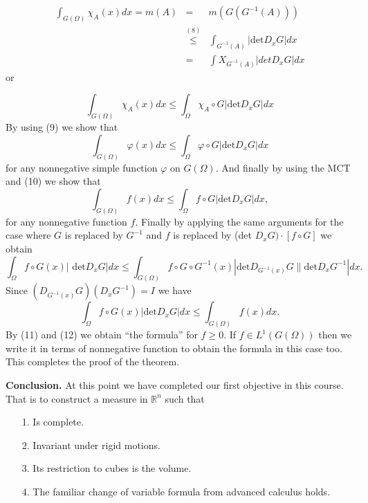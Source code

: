 \documentclass[12pt]{report}
\begin{document}
\begin{eqnarray*}
\int_{G(\Omega)} \chi_A(x) dx = m(A) &=& m(G(G^{-1}(A)))\\
&\overset{(8)}{\le}& \int_{G^{-1}(A)} |\mbox{det} D_x G| dx\\
&=& \int X_{G^{-1}(A)} |det D_x G| dx
\end{eqnarray*}
or

\begin{equation*}
\int_{G(\Omega)} \chi_A (x) dx \le \int_\Omega \chi_A \circ G
|\mbox{det} D_x G| dx \tag{9}
\end{equation*}
By using (9) we show that
\begin{equation*}
\int_{G(\Omega)} \varphi (x) dx\le \int_\Omega \varphi \circ
G|\mbox{det} D_x G| dx \tag{10}
\end{equation*}
for any nonnegative simple function $\varphi$ on $G(\Omega)$. 
And finally by using the MCT and (10) we show that
\begin{equation*}
\int_{G(\Omega)} f(x) dx \le \int_\Omega f \circ G |\mbox{det}
D_x G| dx, \tag{11}
\end{equation*}
for any nonnegative function $f$.  Finally by applying the same
arguments for the case where $G$ is replaced by $G^{-1}$ and
$f$ is replaced by (det $D_xG) \cdot [f \circ G]$ we obtain
\[ \int_\Omega f \circ G(x) | \mbox{ det} D_x G| dx \le
\int_{G(\Omega)} f \circ G \circ G^{-1} (x) |\mbox{det}
D_{G^{-1}(x)} G\|\mbox{det} D_x G^{-1}| dx.
\]
Since $(D_{G^{-1}(x)} G)(D_xG^{-1}) = I$ we have
\begin{equation*}
\int_\Omega f \circ G(x) | \mbox{det} D_x G| dx \le
\int_{G(\Omega)} f(x) dx. \tag{12}
\end{equation*}
By (11) and (12) we obtain ``the formula'' for $f \ge 0$.   If $f
\in L^1 (G(\Omega))$ then we write it in terms of nonnegative
function to obtain the formula in this case too.  This completes
the proof of the theorem.

\vspace{.25cm}
\noindent
{\bf Conclusion.}  At this point we have completed our first
objective in this course.  That is to construct a measure in
$\mathbb{R}^n$ such that
\begin{itemize}
\item[1.]  Is complete.
\item[2.]  Invariant under rigid motions.
\item[3.]  Its restriction to cubes is the volume.
\item[4.]  The familiar change of variable formula from
advanced calculus holds.
\end{itemize}
 
\end{document}
